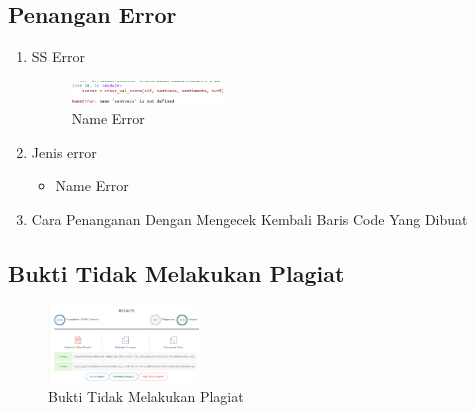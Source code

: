 \subsection{Penangan Error}
\begin{enumerate}
	\item SS Error
	\hfill\break
		\begin{figure}[H]
			\includegraphics[width=4cm]{figures/1174086/error/5/5_name_error.png}
			\centering
			\caption{Name Error}
		\end{figure}
	\item Jenis error
	\begin{itemize}
		\item Name Error
	\end{itemize}
	\item Cara Penanganan
	\hfill\break
	Dengan Mengecek Kembali Baris Code Yang Dibuat
\end{enumerate}
\subsection{Bukti Tidak Melakukan Plagiat}
\hfill\break
\begin{figure}[H]
	\includegraphics[width=4cm]{figures/1174086/bukti/5.png}
	\centering
	\caption{Bukti Tidak Melakukan Plagiat}
\end{figure}
